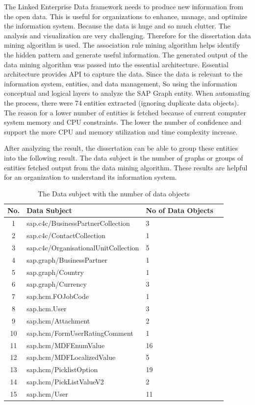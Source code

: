 \documentclass{article}
\begin{document}
The Linked Enterprise Data framework needs to produce new information from the open data. This is useful for organizations to enhance, manage, and optimize the information system. Because the data is huge and so much clutter. The analysis and visualization are very challenging. Therefore for the dissertation data mining algorithm is used. The association rule mining algorithm helps identify the hidden pattern and generate useful information. The generated output of the data mining algorithm was passed into the essential architecture. Essential architecture provides API to capture the data. Since the data is relevant to the information system, entities, and data management, So using the information conceptual and logical layers to analyze the SAP Graph entity. When automating the process, there were 74 entities extracted (ignoring duplicate data objects). The reason for a lower number of entities is fetched because of current computer system memory and CPU constraints. The lower the number of confidence and support the more CPU and memory utilization and time complexity increase.

After analyzing the result, the dissertation can be able to group these entities into the following result. The data subject is the number of graphs or groups of entities fetched output from the data mining algorithm. These results are helpful for an organization to understand its information system.

\begin{table}[ht!]
\centering
\begin{adjustbox}{width=\columnwidth,center}
\begin{tabular}{|c|l|ll|}
\hline
\textbf{No.} & \textbf{Data Subject} & \textbf{No of Data Objects} & \\
\hline
1 & sap.c4c/BusinessPartnerCollection & 3 & \\
2 & sap.c4c/ContactCollection & 1 & \\
3 & sap.c4c/OrganisationalUnitCollection & 5 & \\
4 & sap.graph/BusinessPartner & 1 & \\
5 & sap.graph/Country & 1 & \\
6 & sap.graph/Currency & 3 & \\
7 & sap.hcm.FOJobCode & 1 & \\
8 & sap.hcm.User & 3 & \\
9 & sap.hcm/Attachment & 2 & \\
10 & sap.hcm/FormUserRatingComment & 1 & \\
11 & sap.hcm/MDFEnumValue & 16 & \\
12 & sap.hcm/MDFLocalizedValue & 5 & \\
13 & sap.hcm/PicklistOption & 19 & \\
14 & sap.hcm/PickListValueV2 & 2 & \\
15 & sap.hcm/User & 11 & \\
\hline
\end{tabular}
\end{adjustbox}
\caption{The Data subject with the number of data objects}
\end{table}
\end{document}

